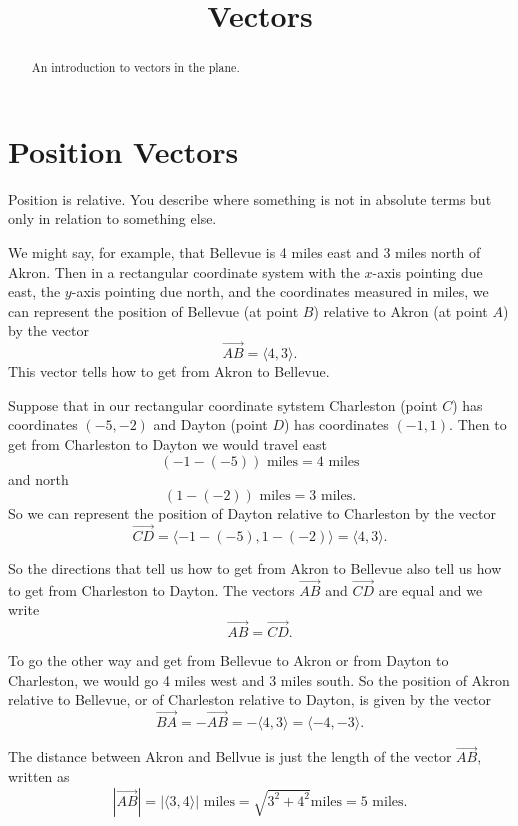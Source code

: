 \documentclass{ximera}
\title{Vectors}
\begin{document}
\begin{abstract}
An introduction to vectors in the plane.
\end{abstract}
\maketitle

\section{Position Vectors}

Position is relative. You describe where something is not in absolute terms but only in relation to something else.

We might say, for example, that Bellevue is 4 miles east and 3 miles north of Akron. Then in a rectangular coordinate system with the $x$-axis pointing due east, the $y$-axis pointing due north, and the coordinates measured in miles, we can represent the position of Bellevue (at point $B$) relative to Akron (at point $A$) by the vector
\[
   \overrightarrow{AB} = \langle 4, 3 \rangle .
\]
This vector tells how to get from Akron to Bellevue. 


Suppose that in our rectangular coordinate sytstem Charleston (point $C$) has coordinates $(-5,-2)$ and Dayton (point $D$) has coordinates $(-1,1)$. Then to get from Charleston to Dayton we would travel east
\[
     ( -1 - (-5) ) \text{ miles} = 4 \text{ miles}
\]
and north
\[
     ( 1 - (-2)) \text{ miles} = 3\text{ miles} .
\]
So we can represent the position of Dayton relative to Charleston by the vector
\[
  \overrightarrow{CD} =       \langle -1 - (-5) , 1- (-2)  \rangle   =  \langle 4, 3 \rangle .
\] 

So the directions that tell us how to get from Akron to Bellevue also tell us how to get from Charleston to Dayton. The
vectors $\overrightarrow{AB}$ and $\overrightarrow{CD}$ are equal and we write 
\[
      \overrightarrow{AB} = \overrightarrow{CD} .
\]

To go the other way and get from Bellevue to Akron or from Dayton to Charleston, we would go 4 miles west and 3 miles south. So the  position of Akron relative to Bellevue, or of Charleston relative to Dayton, is given by the vector
\[ 
   \overrightarrow{BA} = - \overrightarrow{AB} = - \langle 4,3 \rangle =  \langle -4,-3 \rangle.
\]

The distance between Akron and Bellvue is just the length of the vector $\overrightarrow{AB}$, written as
\[
    | \overrightarrow{AB}  | =  | \langle 3, 4 \rangle  | \text{ miles} = \sqrt{3^2 + 4^2} \text{miles} = 5 \text{ miles} .
\] 
\end{document}

